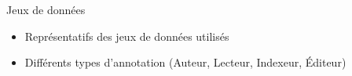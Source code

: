 \begin{frame}
\begin{center}
     \end{center}
\end{frame}

\begin{frame}{Jeux de données}
    
    \begin{itemize}
        \item Représentatifs des jeux de données utilisés
        \item Différents types d'annotation (Auteur, Lecteur, Indexeur, \'Editeur)
    \end{itemize}
\end{frame}

